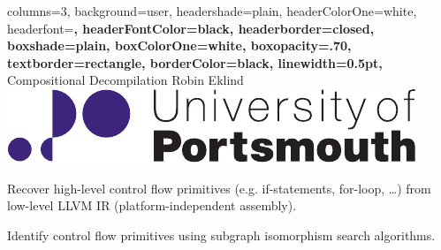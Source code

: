 \documentclass[a2paper,landscape,fontscale=0.35]{baposter}
\begin{document}
\begin{poster}{
	columns=3,
	background=user,
	headershade=plain,
	headerColorOne=white,
	headerfont=\Large\bfseries,
	headerFontColor=black,
	headerborder=closed,
	boxshade=plain,
	boxColorOne=white,
	boxopacity=.70,
	textborder=rectangle,
	borderColor=black,
	linewidth=0.5pt,
}
{}
{Compositional Decompilation}
{Robin Eklind}
{\includegraphics[height=0.05\textheight]{inc/logo.pdf}}

{
	Recover high-level control flow primitives (e.g. if-statements, for-loop, …) from low-level LLVM IR (platform-independent assembly).
}

{
	Identify control flow primitives using subgraph isomorphism search algorithms.

}
\end{poster}
\end{document}
